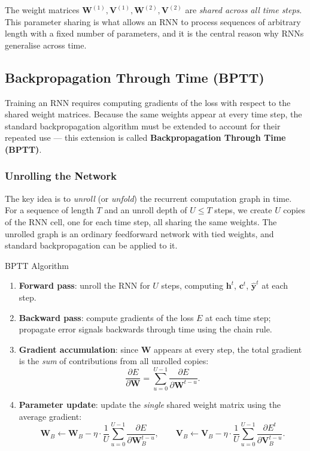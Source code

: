 \documentclass[11pt,a4paper]{article}
\newcommand{\term}[1]{\textcolor{DefGreen}{\textbf{#1}}}
\begin{document}
\begin{notebox}
The weight matrices $\mathbf{W}^{(1)}, \mathbf{V}^{(1)}, \mathbf{W}^{(2)}, \mathbf{V}^{(2)}$ are \emph{shared across all time steps}. This parameter sharing is what allows an RNN to process sequences of arbitrary length with a fixed number of parameters, and it is the central reason why RNNs generalise across time.
\end{notebox}

\subsection{Backpropagation Through Time (BPTT)}
\label{sec:bptt}

Training an RNN requires computing gradients of the loss with respect to the shared weight matrices. Because the same weights appear at every time step, the standard backpropagation algorithm must be extended to account for their repeated use — this extension is called \term{Backpropagation Through Time (BPTT)}.

\subsubsection{Unrolling the Network}

The key idea is to \emph{unroll} (or \emph{unfold}) the recurrent computation graph in time. For a sequence of length $T$ and an unroll depth of $U \leq T$ steps, we create $U$ copies of the RNN cell, one for each time step, all sharing the same weights. The unrolled graph is an ordinary feedforward network with tied weights, and standard backpropagation can be applied to it.

\begin{algobox}{BPTT Algorithm}
\begin{enumerate}
  \item \textbf{Forward pass}: unroll the RNN for $U$ steps, computing $\mathbf{h}^t$, $\mathbf{c}^t$, $\hat{\mathbf{y}}^t$ at each step.
  \item \textbf{Backward pass}: compute gradients of the loss $E$ at each time step; propagate error signals backwards through time using the chain rule.
  \item \textbf{Gradient accumulation}: since $\mathbf{W}$ appears at every step, the total gradient is the \emph{sum} of contributions from all unrolled copies:
  \[
    \frac{\partial E}{\partial \mathbf{W}} = \sum_{u=0}^{U-1} \frac{\partial E}{\partial \mathbf{W}^{t-u}}.
  \]
  \item \textbf{Parameter update}: update the \emph{single} shared weight matrix using the average gradient:
  \[
    \mathbf{W}_B \leftarrow \mathbf{W}_B - \eta \cdot \frac{1}{U}\sum_{u=0}^{U-1}\frac{\partial E}{\partial \mathbf{W}_B^{t-u}},
    \qquad
    \mathbf{V}_B \leftarrow \mathbf{V}_B - \eta \cdot \frac{1}{U}\sum_{u=0}^{U-1}\frac{\partial E^t}{\partial \mathbf{V}_B^{t-u}}.
  \]
\end{enumerate}
\end{algobox}
\end{document}

